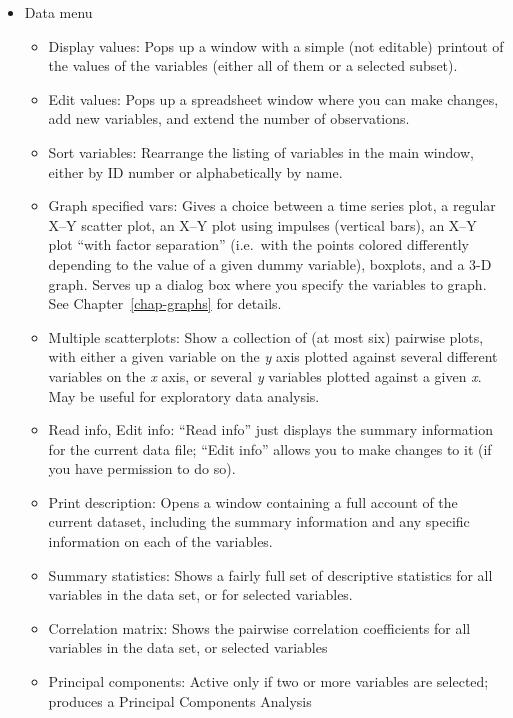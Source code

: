 \begin{itemize}
\item \textsf{Data menu}
  \begin{itemize}
  \item \textsf{Display values}: Pops up a window with a simple (not
    editable) printout of the values of the variables (either all of
    them or a selected subset).
  \item \textsf{Edit values}: Pops up a spreadsheet window where you
    can make changes, add new variables, and extend the number of
    observations.
  \item \textsf{Sort variables}: Rearrange the listing of variables in
    the main window, either by ID number or alphabetically by name.
  \item \textsf{Graph specified vars}: Gives a choice between a time
    series plot, a regular X--Y scatter plot, an X--Y plot using
    impulses (vertical bars), an X--Y plot ``with factor separation''
    (i.e.\ with the points colored differently depending to the value
    of a given dummy variable), boxplots, and a 3-D graph. Serves up a
    dialog box where you specify the variables to graph. See
    Chapter~\ref{chap-graphs} for details.
  \item \textsf{Multiple scatterplots}: Show a collection of (at most
    six) pairwise plots, with either a given variable on the \emph{y}
    axis plotted against several different variables on the \emph{x}
    axis, or several \emph{y} variables plotted against a given
    \emph{x}. May be useful for exploratory data analysis.
  \item \textsf{Read info}, \textsf{Edit info}: ``Read info'' just
    displays the summary information for the current data file; ``Edit
    info'' allows you to make changes to it (if you have permission to
    do so).
  \item \textsf{Print description}: Opens a window containing a full
    account of the current dataset, including the summary information
    and any specific information on each of the variables.
  \item \textsf{Summary statistics}: Shows a fairly full set of
    descriptive statistics for all variables in the data set, or for
    selected variables.
  \item \textsf{Correlation matrix}: Shows the pairwise correlation
    coefficients for all variables in the data set, or selected
    variables
  \item \textsf{Principal components}: Active only if two or more
    variables are selected; produces a Principal Components Analysis

\end{itemize}
\end{itemize}
